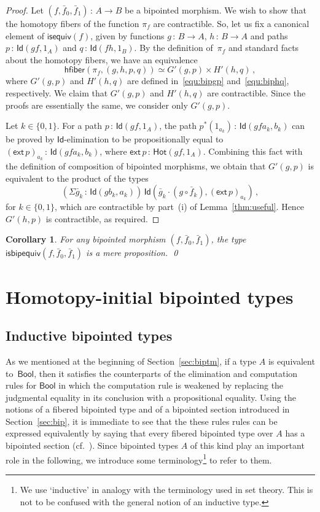 \documentclass[10pt,a4paper,oneside,reqno]{amsart}
\numberwithin{equation}{section}
\theoremstyle{mythm}
\newtheorem{corollary}[theorem]{Corollary}
\theoremstyle{mydef}
\theoremstyle{myrmk}
\newcommand{\co}{\,{:}\,}
\newcommand{\ct}{\cdot}
\newcommand{\hfiber}{\mathsf{hfiber}}
\newcommand{\isequiv}{\mathsf{isequiv}}
\newcommand{\Hot}{\mathsf{Hot}}
\newcommand{\ext}{\mathsf{ext}}
\newcommand{\Bool}{\mathsf{Bool}}
\newcommand{\Id}{\mathsf{Id}}
\newcommand{\isbipequiv}{\mathsf{isbipequiv}}
\begin{document}
\begin{proof}
Let  $(f, \bar{f}_0, \bar{f}_1) \co A \to B$ be a bipointed morphism. We wish to show that the homotopy fibers
of the function $\pi_f$ are contractible. So, let us fix a canonical element of $\isequiv(f)$, given by functions $g \co B
\to A$, $h \co B \to A$ and paths $p \co \Id(gf, 1_A)$ and $q \co \Id(fh, 1_B)$. By the definition of~$\pi_f$ and standard
facts about the homotopy fibers, we have an equivalence 
\[
\hfiber(\pi_f, (g,h, p, q)) \simeq G'(g,p) \times H'(h,q) \, ,
\]
 where $G'(g,p)$ and $H'(h,q)$ are defined
in~\eqref{equ:bipgp} and~\eqref{equ:biphq}, respectively. 
We claim that $G'(g,p)$ and $H'(h,q)$ are contractible. Since
the proofs are essentially the same, we consider only $G'(g,p)$.  

Let $k \in \{0, 1 \}$. For a path $p \co \Id(gf, 1_A)$, the path $p^*(1_{a_k}) \co \Id( gf a_k, b_k)$ can be proved by $\Id$-elimination to be propositionally equal to $(\ext \, p)_{a_k}\co \Id(gfa_k, b_k)$, where $\ext \, p \co \Hot(gf, 1_A)$. Combining this fact with the definition of composition of bipointed morphisms, we obtain that
$G'(g,p)$ is equivalent to the product of the types
\[
(\Sigma \bar{g}_k \co \Id( gb_k, a_k)) \, \Id ( \bar{g}_k \ct (g \circ \bar{f}_k), (\ext \, p)_{a_k}) \, ,
\]
for $k \in \{0, 1 \}$, which are contractible by part~(i) of Lemma~\ref{thm:useful}. Hence $G'(h,p)$ is contractible, as required.
\end{proof}


\begin{corollary} For any bipointed morphism $(f, \bar{f}_0, \bar{f}_1)$, the type $\isbipequiv(f, \bar{f}_0, \bar{f}_1)$ is a mere proposition. \qed
\end{corollary} 





\section{Homotopy-initial bipointed types} 
\label{sec:homibt}


\subsection*{Inductive bipointed types} 
As we mentioned at the beginning of Section~\ref{sec:biptm}, if a type $A$ is equivalent to~$\Bool$, then 
it satisfies the counterparts of the elimination and computation rules for $\Bool$ in which the computation rule is 
weakened by replacing the judgmental equality in its conclusion with a propositional equality. Using the notions of a fibered bipointed type and of a bipointed section introduced in Section~\ref{sec:bip}, it is immediate to see that the these rules rules can be expressed equivalently by saying  that every fibered  bipointed type over $A$ has a bipointed 
section (cf.~\cite{Joyal:cathtt}). Since bipointed types $A$ of this kind  play an important role in the following, we introduce some terminology\footnote{We use `inductive' in analogy with the terminology used in set theory. This is not to be confused with the general notion of an inductive type.} to refer to them.
\end{document}
